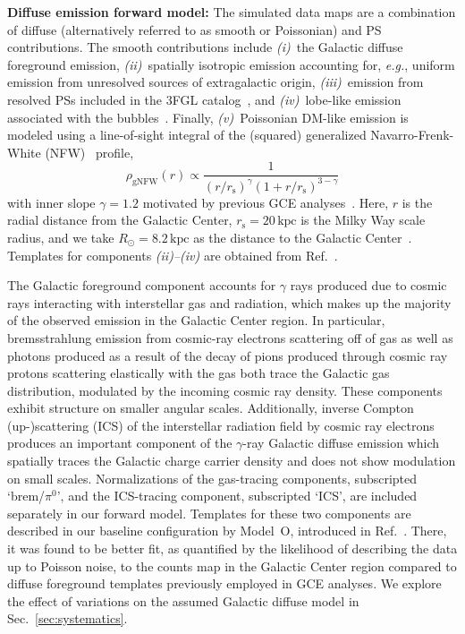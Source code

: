 \documentclass[prd,aps,10pt,nofootinbib,twocolumn,superscriptaddress,preprintnumbers,balancelastpage,longbibliography,floatfix]{revtex4-2}
\begin{document}
\noindent
\textbf{Diffuse emission forward model:} The simulated data maps are a combination of diffuse (alternatively referred to as smooth or Poissonian) and PS contributions. The smooth contributions include \emph{(i)}~the Galactic diffuse foreground emission, \emph{(ii)}~spatially isotropic emission accounting for, \emph{e.g.}, uniform emission from unresolved sources of extragalactic origin, \emph{(iii)}~emission from resolved PSs included in the \Fermi 3FGL catalog~\cite{Fermi-LAT:2015bhf}, and \emph{(iv)}~lobe-like emission associated with the \Fermi bubbles~\cite{Su:2010qj}. Finally, \emph{(v)}~Poissonian DM-like emission is modeled using a line-of-sight integral of the (squared) generalized Navarro-Frenk-White (NFW)~\cite{Navarro:1995iw,Navarro:1996gj} profile,
\begin{equation}
\label{eq:nfw}
\rho_\mathrm{gNFW}(r) \propto \frac{1}{\left(r / r_{\mathrm s}\right)^{\gamma}\left(1+r / r_{\mathrm s}\right)^{3-\gamma}}
\end{equation}
with inner slope $\gamma=1.2$ motivated by previous GCE analyses~\cite{Gordon:2013vta,Daylan:2014rsa,Zhou:2014lva}. Here, $r$ is the radial distance from the Galactic Center, $r_{\mathrm s}=20\,\mathrm{kpc}$ is the Milky Way scale radius, and we take $R_\odot = 8.2\,\mathrm{kpc}$ as the distance to the Galactic Center~\cite{2020arXiv201202169B,2019A&A...625L..10G}. Templates for components \emph{(ii)--(iv)} are obtained from Ref.~\cite{Mishra-Sharma:2016gis}. 

The Galactic foreground component accounts for $\gamma$ rays produced due to cosmic rays interacting with interstellar gas and radiation, which makes up the majority of the observed emission in the Galactic Center region. In particular, bremsstrahlung emission from cosmic-ray electrons scattering off of gas as well as photons produced as a result of the decay of pions produced through cosmic ray protons scattering elastically with the gas both trace the Galactic gas distribution, modulated by the incoming cosmic ray density. These components exhibit structure on smaller angular scales. Additionally, inverse Compton (up-)scattering (ICS) of the interstellar radiation field by cosmic ray electrons produces an important component of the $\gamma$-ray Galactic diffuse emission which spatially traces the Galactic charge carrier density and does not show modulation on small scales. Normalizations of the gas-tracing components, subscripted `brem/$\pi^0$', and the ICS-tracing component, subscripted `ICS', are included separately in our forward model. Templates for these two components are described in our baseline configuration by {Model~O}, introduced in Ref.~\cite{Buschmann:2020adf}. There, it was found to be better fit, as quantified by the likelihood of describing the data up to Poisson noise, to the counts map in the Galactic Center region compared to diffuse foreground templates previously employed in GCE analyses. We explore the effect of variations on the assumed Galactic diffuse model in Sec.~\ref{sec:systematics}. 
\end{document}
